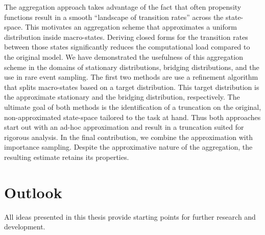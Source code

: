 The aggregation approach takes advantage of the fact that often propensity functions result in a smooth ``landscape of transition rates'' across the state-space.
This motivates an aggregation scheme that approximates a uniform distribution inside macro-states.
Deriving closed forms for the transition rates between those states significantly reduces the computational load compared to the original model.
We have demonstrated the usefulness of this aggregation scheme in the domains of stationary distributions, bridging distributions, and the use in rare event sampling.
The first two methods are use a refinement algorithm that splits macro-states based on a target distribution. 
This target distribution is the approximate stationary and the bridging distribution, respectively.
The ultimate goal of both methods is the identification of a truncation on the original, non-approximated state-space tailored to the task at hand.
Thus both approaches start out with an ad-hoc approximation and result in a truncation suited for rigorous analysis.
In the final contribution, we combine the approximation with importance sampling.
Despite the approximative nature of the aggregation, the resulting estimate retains its properties.



\section{Outlook}
All ideas presented in this thesis provide starting points for further research and development.

